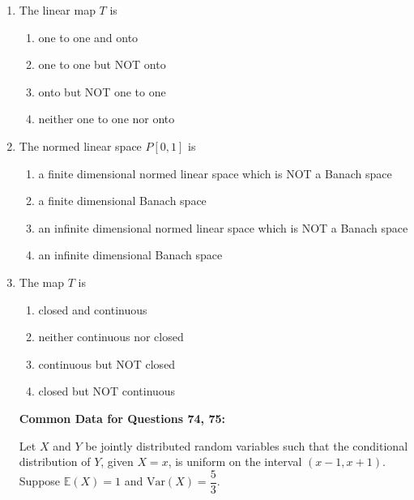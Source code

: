 \documentclass[journal]{IEEEtran}
\numberwithin{equation}{enumi}
\numberwithin{figure}{enumi}
\begin{document}
\begin{enumerate}
\vspace{1em}

\item The linear map $T$ is
\hfill{}
\begin{multicols}{2}
    \begin{enumerate}
        \item one to one and onto
        \item one to one but NOT onto
        \item onto but NOT one to one
        \item neither one to one nor onto
    \end{enumerate}
    \end{multicols}




\item The normed linear space $P[0,1]$ is
\hfill{}

\begin{enumerate}
   
    \item a finite dimensional normed linear space which is NOT a Banach space
    \item a finite dimensional Banach space
    \item an infinite dimensional normed linear space which is NOT a Banach space
    \item an infinite dimensional Banach space
\end{enumerate}



\item The map $T$ is
\hfill{}
\begin{multicols}{2}
    \begin{enumerate}
        \item closed and continuous
        \item neither continuous nor closed
        \item continuous but NOT closed
        \item closed but NOT continuous
    \end{enumerate}
    \end{multicols}

\bigskip

\textbf{Common Data for Questions 74, 75:}
\bigskip

Let $X$ and $Y$ be jointly distributed random variables such that the conditional distribution of $Y$, given $X = x$, is uniform on the interval $(x - 1, x + 1)$. Suppose $\mathbb{E}(X) = 1$ and $\text{Var}(X) = \dfrac{5}{3}$.




\end{enumerate}
\end{document}
